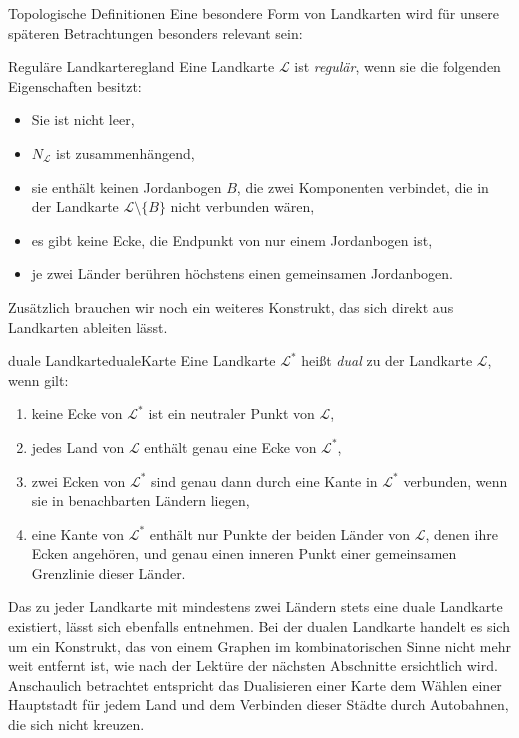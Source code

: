 \begin{section}{Topologische Definitionen}
 Eine besondere Form von Landkarten wird für unsere späteren Betrachtungen besonders relevant sein:
 
 \begin{definitionl}{Reguläre Landkarte}{regland}
  Eine Landkarte $\mathcal{L}$ ist \textit{regulär}, wenn sie die folgenden Eigenschaften besitzt:
  \begin{itemize}
   \item Sie ist nicht leer,
   \item $N_{\mathcal{L}}$ ist zusammenhängend,
   \item sie enthält keinen Jordanbogen $B$, die zwei Komponenten verbindet, die in der Landkarte $\mathcal{L} \setminus \{B\}$ nicht verbunden wären,
   \item es gibt keine Ecke, die Endpunkt von nur einem Jordanbogen ist,
   \item je zwei Länder berühren höchstens einen gemeinsamen Jordanbogen.
  \end{itemize}
 \end{definitionl}
 
 Zusätzlich brauchen wir noch ein weiteres Konstrukt, das sich direkt aus Landkarten ableiten lässt.

 \begin{definitionl}{duale Landkarte}{dualeKarte}
  Eine Landkarte $\mathcal{L}^*$ heißt \textit{dual} zu der Landkarte $\mathcal{L}$, wenn gilt:
  \begin{enumerate}
   \item keine Ecke von $\mathcal{L}^*$ ist ein neutraler Punkt von $\mathcal{L}$,
   \item jedes Land von $\mathcal{L}$ enthält genau eine Ecke von $\mathcal{L}^*$,
   \item zwei Ecken von $\mathcal{L}^*$ sind genau dann durch eine Kante in $\mathcal{L}^*$ verbunden, wenn sie in benachbarten Ländern liegen,
   \item eine Kante von $\mathcal{L}^*$ enthält nur Punkte der beiden Länder von $\mathcal{L}$, denen ihre Ecken angehören, und genau einen inneren Punkt einer gemeinsamen Grenzlinie dieser Länder.
  \end{enumerate}
 \end{definitionl}
 
 Das zu jeder Landkarte mit mindestens zwei Ländern stets eine duale Landkarte existiert, lässt sich ebenfalls \cite{fritsch} entnehmen. Bei der dualen Landkarte handelt es sich um ein Konstrukt, das von einem Graphen im kombinatorischen Sinne nicht mehr weit entfernt ist, wie nach der Lektüre der nächsten Abschnitte ersichtlich wird. Anschaulich betrachtet entspricht das Dualisieren einer Karte dem Wählen einer Hauptstadt für jedem Land und dem Verbinden dieser Städte durch Autobahnen, die sich nicht kreuzen.
 

\end{section}
